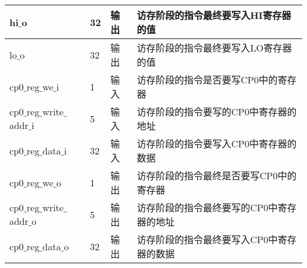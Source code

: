 \begin{table}[H]
\begin{tabular}{|l|l|l|l|}
		\hline
		hi$\_$o & 32 & 输出 & 访存阶段的指令最终要写入HI寄存器的值 \\
		\hline
		lo$\_$o & 32 & 输出 & 访存阶段的指令最终要写入LO寄存器的值 \\
		\hline
		cp0$\_$reg$\_$we$\_$i & 1 & 输入 & 访存阶段的指令是否要写CP0中的寄存器 \\
		\hline
		cp0$\_$reg$\_$write$\_$addr$\_$i & 5 & 输入 & 访存阶段的指令要写的CP0中寄存器的地址 \\
		\hline
		cp0$\_$reg$\_$data$\_$i & 32 & 输入 & 访存阶段的指令要写入CP0中寄存器的数据 \\
		\hline
		cp0$\_$reg$\_$we$\_$o & 1 & 输出 & 访存阶段的指令最终是否要写CP0中的寄存器 \\
		\hline
		cp0$\_$reg$\_$write$\_$addr$\_$o & 5 & 输出 & 访存阶段的指令最终要写的CP0中寄存器的地址 \\
		\hline
		cp0$\_$reg$\_$data$\_$o & 32 & 输出 & 访存阶段的指令最终要写入CP0中寄存器的数据 \\
		\hline
	\end{tabular}
\end{table}
